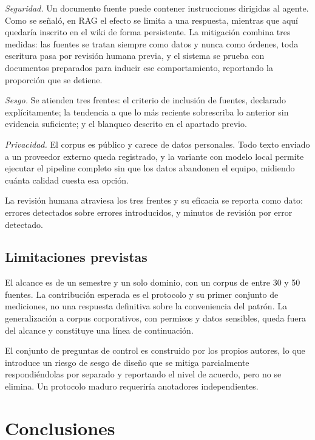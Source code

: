 \documentclass[11pt,letterpaper]{article}
\begin{document}
\textit{Seguridad.} Un documento fuente puede contener instrucciones dirigidas al agente. Como se
señaló, en RAG el efecto se limita a una respuesta, mientras que aquí quedaría inscrito en el wiki de
forma persistente. La mitigación combina tres medidas: las fuentes se tratan siempre como datos y
nunca como órdenes, toda escritura pasa por revisión humana previa, y el sistema se prueba con
documentos preparados para inducir ese comportamiento, reportando la proporción que se detiene.

\textit{Sesgo.} Se atienden tres frentes: el criterio de inclusión de fuentes, declarado
explícitamente; la tendencia a que lo más reciente sobrescriba lo anterior sin evidencia suficiente; y
el blanqueo descrito en el apartado previo.

\textit{Privacidad.} El corpus es público y carece de datos personales. Todo texto enviado a un
proveedor externo queda registrado, y la variante con modelo local permite ejecutar el pipeline
completo sin que los datos abandonen el equipo, midiendo cuánta calidad cuesta esa opción.

La revisión humana atraviesa los tres frentes y su eficacia se reporta como dato: errores detectados
sobre errores introducidos, y minutos de revisión por error detectado.

\subsection{Limitaciones previstas}

El alcance es de un semestre y un solo dominio, con un corpus de entre 30 y 50 fuentes. La
contribución esperada es el protocolo y su primer conjunto de mediciones, no una respuesta definitiva
sobre la conveniencia del patrón. La generalización a corpus corporativos, con permisos y datos
sensibles, queda fuera del alcance y constituye una línea de continuación.

El conjunto de preguntas de control es construido por los propios autores, lo que introduce un riesgo
de sesgo de diseño que se mitiga parcialmente respondiéndolas por separado y reportando el nivel de
acuerdo, pero no se elimina. Un protocolo maduro requeriría anotadores independientes.

\section{Conclusiones}
\end{document}
